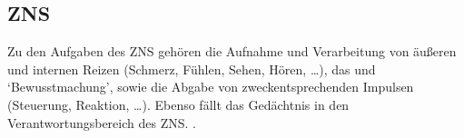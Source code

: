 \documentclass[
ngerman,
paper=a4,
asymmetric,
fontsize=10pt,
draft=false,
numbers=noenddot,
bibtotocnumbered,
footnotes=multiple,
]{scrreprt}
\newcommand{\jNEU}{\vspace{6pt}\noindent{\color{green}\sffamily\textbf{ADDED}\hrulefill\newline}}
\newcommand{\jNEUende}{\newline{\color{green}\rule{\linewidth}{3pt}\newline}}
\begin{document}




% 


\subsection{ZNS}

{Zu den Aufgaben des ZNS gehören die Aufnahme  und Verarbeitung  von äußeren und
    internen  Reizen
    (Schmerz, Fühlen, Sehen, Hören, {\dots}), das
 und
    \enquote*{Bewusstmachung}, 
\jNEU
sowie die  Abgabe  von zweckentsprechenden Impulsen
    (Steuerung, Reaktion, {\dots}). Ebenso fällt das Gedächtnis 
    in den Verantwortungsbereich des ZNS.}
    .
\jNEUende
\end{document}
